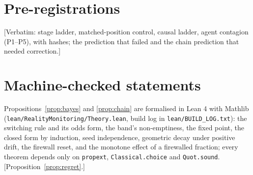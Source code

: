 \documentclass{article}
\newcommand{\pending}[1]{\textcolor{blue!70!black}{[#1]}}
\begin{document}



\appendix
\section{Pre-registrations}\label{app:prereg}
\pending{Verbatim: stage ladder, matched-position control, causal ladder, agent contagion (P1--P5), with hashes; the prediction that failed and the chain prediction that needed correction.}
\section{Machine-checked statements}\label{app:lean}
Propositions~\ref{prop:bayes} and \ref{prop:chain} are formalised in Lean 4 with Mathlib (\texttt{lean/RealityMonitoring/Theory.lean}, build log in \texttt{lean/BUILD\_LOG.txt}): the switching rule and its odds form, the band's non-emptiness, the fixed point, the closed form by induction, seed independence, geometric decay under positive drift, the firewall reset, and the monotone effect of a firewalled fraction; every theorem depends only on \texttt{propext}, \texttt{Classical.choice} and \texttt{Quot.sound}. \pending{Proposition~\ref{prop:regret}.}
\end{document}

